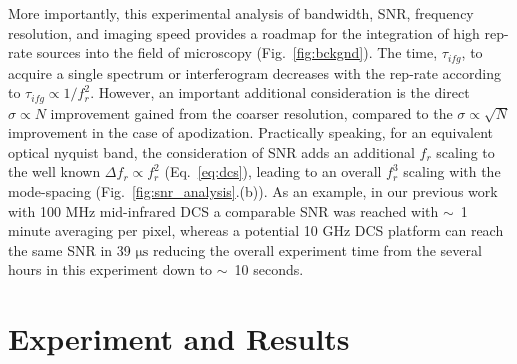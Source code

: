 \documentclass[aip,reprint]{revtex4-1}
\begin{document}
More importantly, this experimental analysis of bandwidth, SNR, frequency resolution, and imaging speed provides a roadmap for the integration of high rep-rate sources into the field of microscopy (\mbox{Fig. \ref{fig:bckgnd}}). The time, $\tau_{ifg}$, to acquire a single spectrum or interferogram decreases with the rep-rate according to $\tau_{ifg} \propto 1 / f_r^2$. However, an important additional consideration is the direct $\sigma \propto N$ improvement gained from the coarser resolution, compared to the $\sigma \propto \sqrt{N}$ improvement in the case of apodization. Practically speaking, for an equivalent optical nyquist band, the consideration of SNR adds an additional $f_r$ scaling to the well known $\Delta f_r \propto f_r^2$ (\mbox{Eq. \ref{eq:dcs}}), leading to an overall $f_r^3$ scaling with the mode-spacing (\mbox{Fig. \ref{fig:snr_analysis}.(b)}). As an example, in our previous work with 100 MHz mid-infrared DCS \cite{lindMidInfraredFrequencyComb2020,timmersMolecularFingerprintingBright2018} a comparable SNR was reached with \mbox{$\sim$ 1} minute averaging per pixel, whereas a potential 10 GHz DCS platform can reach the same SNR in 39 $\mathrm{\mu s}$ reducing the overall experiment time from the several hours in this experiment down to \mbox{$\sim$ 10} seconds.


\section{Experiment and Results}

\end{document}
